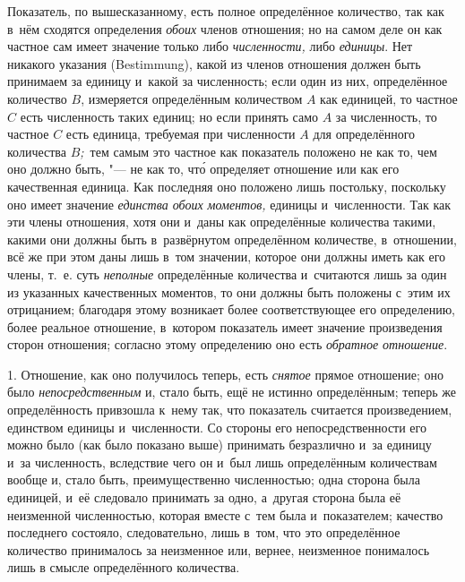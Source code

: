 Показатель, по вышесказанному, есть полное определённое количество, так как
в~нём сходятся определения {\em обоих} членов отношения; но на самом деле он
как частное сам имеет значение только либо {\em численности,} либо
{\em единицы}. Нет никакого указания (Bestimmung), какой из членов отношения
должен быть принимаем за единицу и~какой за численность; если один из них,
определённое количество $B$, измеряется определённым количеством $A$ как
единицей, то частное $C$ есть численность таких единиц; но если принять само
$A$ за численность, то частное $C$ есть единица, требуемая при численности $A$
для определённого количества $B${\em ;\,} тем самым это частное как показатель
положено не как то, чем оно должно быть, "--- не как то, чт\'{о} определяет
отношение или как его качественная единица. Как последняя оно положено лишь
постольку, поскольку оно имеет значение {\em единства обоих моментов,} единицы
и~численности. Так как эти члены отношения, хотя они и~даны как определённые
количества такими, какими они должны быть в~развёрнутом определённом
количестве, в~отношении, всё же при этом даны лишь в~том значении, которое они
должны иметь как его члены, т.~е. суть {\em неполные} определённые количества
и~считаются лишь за один из указанных качественных моментов, то они должны быть
положены с~этим их отрицанием; благодаря этому возникает более соответствующее
его определению, более реальное отношение, в~котором показатель имеет значение
произведения сторон отношения; согласно этому определению оно есть
{\em обратное отношение}.


1. Отношение, как оно получилось теперь, есть {\em снятое} прямое отношение;
оно было {\em непосредственным} и, стало быть, ещё не истинно определённым;
теперь же определённость привзошла к~нему так, что показатель считается
произведением, единством единицы и~численности. Со стороны его
непосредственности его можно было (как было показано выше) принимать
безразлично и~за единицу и~за численность, вследствие чего он и~был лишь
определённым количествам вообще и, стало быть, преимущественно численностью;
одна сторона была единицей, и~её следовало принимать за одно, а~другая сторона
была её неизменной численностью, которая вместе с~тем была и~показателем;
качество последнего состояло, следовательно, лишь в~том, что это определённое
количество принималось за неизменное или, вернее, неизменное понималось лишь в
смысле определённого количества.

